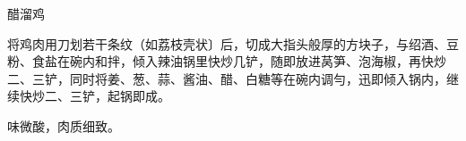 \begin{recipe}{醋溜鸡}

\ingredients




\cooking

将鸡肉用刀划若干条纹（如荔枝壳状〕后，切成大指头般厚的方块子，与绍酒、豆粉、食盐在碗内和拌，倾入辣油锅里快炒几铲，随即放进莴笋、泡海椒，再快炒二、三铲，同时将姜、葱、蒜、酱油、醋、白糖等在碗内调勻，迅即倾入锅内，继续快炒二、三铲，起锅即成。

\notes

味微酸，肉质细致。

\end{recipe}

